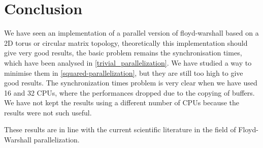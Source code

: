 \section{Conclusion}
We have seen an implementation of a parallel version of floyd-warshall based on a 2D torus or circular matrix topology, theoretically this implementation should give very good results, the basic problem remains the synchronisation times, which have been analysed in \cref{trivial_parallelization}. We have studied a way to minimise them in \cref{squared-parallelization}, but they are still too high to give good results. The synchronization times problem is very clear when we have used 16 and 32 CPUs, where the performances dropped due to the copying of buffers. We have not kept the results using a different number of CPUs because the results were not such useful.

These results are in line with the current scientific literature in the field of  Floyd-Warshall parallelization.

\FloatBarrier
